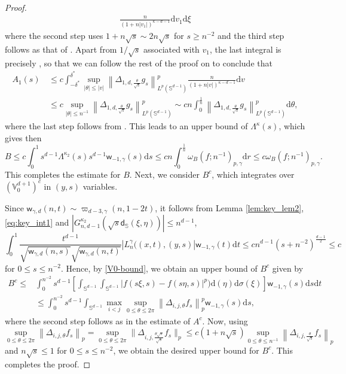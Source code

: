 \documentclass{amsart}
\theoremstyle{remark}
\def\d{\mathrm{d}}
\def\sph{{\mathbb{S}^{d-1}}}
\def\g{{\gamma}}
\def\k{{\kappa}}
\def\t{{\theta}}
\def\s{\sigma}
\def\SS{{\mathbb S}}
\def\VV{{\mathbb V}}
\def\d{\mathrm{d}}
\def\sph{{\mathbb{S}^{d-1}}}
\def\sd{{\mathsf d}}
\def\sw{{\mathsf w}}
\def\g{{\gamma}}
\def\k{{\kappa}}
\def\t{{\theta}}
\def\s{\sigma}
\def\SS{{\mathbb S}}
\def\VV{{\mathbb V}}
\def\f{\frac}
\def\f{\frac}
\begin{document}
\begin{proof}
\begin{align*}
      \frac{n} {(1+ n |v_1|)^{\k-d-1}} \d v_1 \d \xi  
\end{align*} 
where the second step uses $1+n \sqrt{s} \sim 2 n \sqrt{s}$ for $s \ge n^{-2}$ and the third step follows as that
of \cite[(4.3.4)]{DaiX}. Apart from $1/\sqrt{s}$ associated with $v_1$, the last integral is precisely \cite[(4.3.4)]{DaiX}, 
so that we can follow the rest of the proof on \cite[p. 92]{DaiX} to conclude that
\begin{align*}
  A_1(s) \, & \le c  \int_{- \delta^*}^{\delta^*}  \sup_{|\t| \le |v|} \left \|\Delta_{1,d,\frac{\t}{\sqrt{s}}} g_s \right\|_{L^p(\sph)}^p 
     \frac{n} {(1+ n |v|)^{\k-d-1}} \d v \\
  & \le c \sup_{|\t| \le n^{-1} }\left \|\Delta_{1,d,\frac{\t}{\sqrt{s}}} g_s \right\|_{L^p(\sph)}^p  
      \sim c  n  \int_0^{\frac{1}{n} }\left \|\Delta_{1,d,\frac{\t}{\sqrt{s}}} g_s \right\|_{L^p(\sph)}^p  \d \t,
\end{align*}
where the last step follows from \cite[Lemma 4.2.2 (iv)]{DaiX}. This leads to an upper bound of $\Lambda^\k(s)$, which
gives then
$$
 B \le c \int_0^1 s^{d-1} \Lambda^{\k_2}(s) s^{d-1} \sw_{-1,\g}(s) \d s 
     \le c  { n \int_0^{\frac{1}{n}} } \omega_B(f; n^{-1})_{p,\g} \d r \le c \omega_B(f; n^{-1})_{p,\g}.
$$
This completes the estimate for $B$. Next, we consider $B^c$, which integrates over $(\VV_0^{d+1})^c$ in
$(y,s)$ variables. 

Since $\sw_{\g,d}(n,t) \sim \varpi_{d-3,\g}(n, 1-2t)$, it follows from Lemma \ref{lem:key_lem2}, 
 \eqref{eq:key_int1} and $|G_{n,d-1}^{\k_2}\left( \sqrt{s} \sd_{\SS}(\xi,\eta) \right)| \le n^{d-1}$, 
$$
  \int_0^1 \frac{t^{d-1}}{\sqrt{\sw_{\g,d}(n,s)}\sqrt{\sw_{\g,d}(n,t)}}
     |L_n^\g((x,t),(y,s)|  \sw_{-1,\g}(t) \d t \le c n^{d-1} (s+n^{-2})^{\f{d-1}{2}} \le c
$$
for $0\le s \le n^{-2}$. Hence, by \eqref{V0-bound}, we obtain an upper bound of $B^c$ given by
\begin{align*}
   B^c \le  &   \int_0^{n^{-2}} s^{d-1} 
    \left[\int_{\sph}  \int_{\sph} |f(s\xi, s) - f(s \eta,s)|^p)\d(\eta) \d \s(\xi) \right]
       \sw_{-1,\g}(s) \d s \d t \\
   \, & \le   \int_0^{n^{-2}}s^{d-1} \int_{\sph} \max_{i<j} \sup_{0\le \t\le 2 \pi} \left\| \Delta_{i,j,\t} f_s \right\|_p^p
    \sw_{-1,\g}(s) \d s,
\end{align*}
where the second step follows as in the estimate of $A^c$. Now, using 
$$
 \sup_{0\le \t\le 2 \pi} \left\| \Delta_{i,j,\t} f_s \right\|_p 
  = \sup_{0\le \t\le 2 \pi} \Big\| \Delta_{i,j,\frac{\t \sqrt{s}}{\sqrt{s}}} f_s \Big\|_p
   \le c (1+n \sqrt{s})  \sup_{0\le \t\le n^{-1}} \left\| \Delta_{i,j,\frac{\t}{\sqrt{s}}} f_s \right\|_p 
$$
and $n \sqrt{s} \le 1$ for $0 \le s \le n^{-2}$, we obtain the desired upper bound for $B^c$. 
This completes the proof. 
\end{proof}
  
\end{document}
